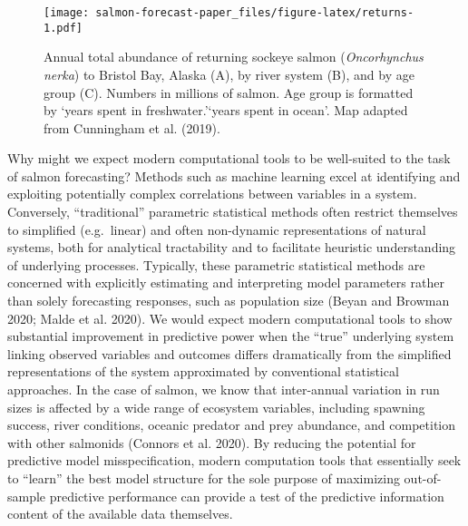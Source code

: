 \documentclass[
]{article}
\begin{document}
\begin{figure}
\centering
\texttt{[image: salmon-forecast-paper\_files/figure-latex/returns-1.pdf]}
\caption{\label{fig:returns}Annual total abundance of returning sockeye salmon (\emph{Oncorhynchus nerka}) to Bristol Bay, Alaska (A), by river system (B), and by age group (C). Numbers in millions of salmon. Age group is formatted by `years spent in freshwater.'`years spent in ocean'. Map adapted from Cunningham et al. (2019).}
\end{figure}

Why might we expect modern computational tools to be well-suited to the task of salmon forecasting? Methods such as machine learning excel at identifying and exploiting potentially complex correlations between variables in a system. Conversely, ``traditional'' parametric statistical methods often restrict themselves to simplified (e.g.~linear) and often non-dynamic representations of natural systems, both for analytical tractability and to facilitate heuristic understanding of underlying processes. Typically, these parametric statistical methods are concerned with explicitly estimating and interpreting model parameters rather than solely forecasting responses, such as population size (Beyan and Browman 2020; Malde et al. 2020). We would expect modern computational tools to show substantial improvement in predictive power when the ``true'' underlying system linking observed variables and outcomes differs dramatically from the simplified representations of the system approximated by conventional statistical approaches. In the case of salmon, we know that inter-annual variation in run sizes is affected by a wide range of ecosystem variables, including spawning success, river conditions, oceanic predator and prey abundance, and competition with other salmonids (Connors et al. 2020). By reducing the potential for predictive model misspecification, modern computation tools that essentially seek to ``learn'' the best model structure for the sole purpose of maximizing out-of-sample predictive performance can provide a test of the predictive information content of the available data themselves.
\end{document}
